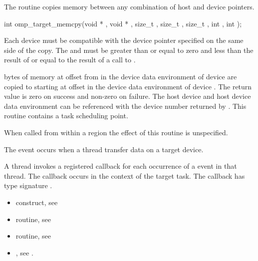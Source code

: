 The  routine copies memory between any combination
of host and device pointers.

\format
\begin{boxedcode}
int omp\_target\_memcpy(void * , void * , size\_t ,
                        size\_t , size\_t ,
                        int , int );
\end{boxedcode}

\constraints
Each device must
be compatible with the device pointer specified on the same side of the copy.
The  and 
must be greater than or equal to zero and less than the result of
 or equal to the result of a call to
.

\effect


 bytes of memory at offset  from  
in the device data environment of device  are
copied to  starting at offset  in the device data
environment of device .  
The return value is zero on success and non-zero on failure.  The host device
and host device data environment can be referenced with the device number
returned by . This routine contains a task
scheduling point.

When called from within a  region 
the effect of this routine is unspecified.

\events
The  event occurs when a thread transfer data on a target device.

\pagebreak
{}
\tools
A thread invokes a registered 
callback for each occurrence of a  event in that thread. 
The callback occurs in the context of the target task.  The callback has type signature
. 


\crossreferences
\begin{itemize}
\item {} construct, see 

\item {} routine, see 

\item {} routine, see 


\item {}, see 
.
\end{itemize}


